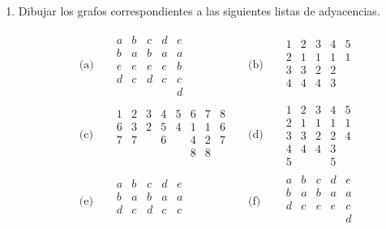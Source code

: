 \documentclass[a4paper,12pt,twoside,spanish,reqno]{amsbook}
\numberwithin{equation}{section}
\begin{document}
\begin{enumerate}
\item\label{ej-ady-a-grafos} Dibujar los grafos correspondientes a las siguientes listas de adyacencias. 

\begin{align*}
    &\text{(a)}&&\begin{matrix}
        a&b&c&d&e \\\hline
        b&a&b&a&a \\
        e&e&e&e&b \\
        d&c&d&c&c \\
        &&&&d
        \end{matrix}&
    &\text{(b)}&& \begin{matrix}
         1& 2& 3& 4& 5\\ \hline
         2& 1& 1& 1& 1\\
         3& 3& 2& 2& \\
         4& 4& 4& 3&\\
         & & & & 
        \end{matrix}
\\[0.3cm]
    &\text{(c)}&&\begin{matrix}
        1& 2& 3& 4& 5& 6& 7& 8\\ \hline
        6& 3& 2& 5& 4& 1& 1& 6\\
        7& 7& & 6& & 4& 2& 7\\
        & & & & & 8& 8& \\
        & & & & & & & 
    \end{matrix}&
    &\text{(d)}&&\begin{matrix}
        1& 2& 3& 4& 5\\ \hline
        2& 1& 1& 1& 1\\
        3& 3& 2& 2& 4\\
        4& 4& 4& 3& \\
        5& & & 5& 
       \end{matrix}       
\\[0.3cm]
    &\text{(e)}&&\begin{matrix}
        a& b& c& d& e\\ \hline
        b& a& b& a& a\\
        d& c& d& c& c\\
        & & & & \\
       \end{matrix}&
    &\text{(f)}&&\begin{matrix}
        a& b& c& d& e\\ \hline
        b& a& b& a& a\\
        d& c& e& e& c\\
        & & & & d\\
       \end{matrix}
\end{align*}


\end{enumerate}
\end{document}
